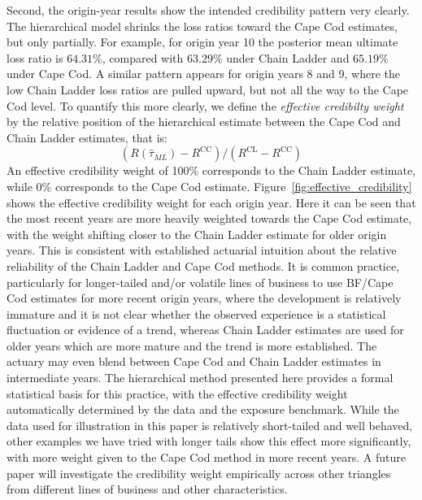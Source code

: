 \documentclass[11pt]{article}
\newcommand{\1}{\mathbf{1}}
\begin{document}
Second, the origin-year results show the intended credibility pattern very clearly. The hierarchical model 
shrinks the loss ratios toward the Cape Cod estimates, but only partially. 
For example, for origin year 10 the posterior mean ultimate loss ratio is $64.31\%$, 
compared with $63.29\%$ under Chain Ladder and $65.19\%$ under Cape Cod. A similar pattern appears for origin years 8 and 9, where the low Chain Ladder 
loss ratios are pulled upward, but not all the way to the Cape Cod level. To quantify this more clearly, we define the 
\emph{effective credibilty weight} by the relative position of the hierarchical estimate between the Cape Cod and Chain Ladder estimates, that is:
\begin{equation}
(R(\widehat \tau_{ML})-R^{\textrm{CC}})/ (R^{\textrm{CL}}-R^{\textrm{CC}})
\end{equation}
An effective credibility weight of 100\% corresponds to the Chain Ladder estimate, while 0\% corresponds to the Cape Cod estimate.
Figure~\ref{fig:effective_credibility} shows the effective credibility weight for each origin year.  
Here it can be seen that the most recent years are more heavily weighted towards the Cape Cod estimate, with the 
weight shifting closer to the Chain Ladder estimate for older origin years. 
This is consistent with established actuarial intuition about the relative reliability of the Chain Ladder and 
Cape Cod methods. It is common practice, particularly for longer-tailed and/or volatile lines of business to use BF/Cape Cod estimates 
for more recent origin years, where the development is relatively immature and it is not clear whether
the observed experience is a statistical fluctuation or evidence of a trend, whereas Chain Ladder estimates are used for older years which are more mature and the trend is more established. The actuary may even blend between Cape Cod and Chain Ladder estimates in intermediate years. The hierarchical method presented here
provides a formal statistical basis for this practice, with the effective credibility weight automatically determined by the data 
and the exposure benchmark. While the data used for illustration in this paper is relatively short-tailed and well behaved,  other examples we have tried with
longer tails show this effect more significantly, with more weight given to the Cape Cod method in more recent years. A future paper will investigate
the credibility weight empirically across other triangles from different lines of business and other characteristics.
\end{document}
